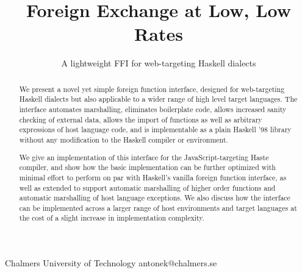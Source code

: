 \documentclass[preprint]{sigplanconf}
\begin{document}
\setlength{\pdfpageheight}{\paperheight}
\setlength{\pdfpagewidth}{\paperwidth}

\exclusivelicense
{} 





\title{Foreign Exchange at Low, Low Rates}
\subtitle{A lightweight FFI for web-targeting Haskell dialects}

           {Chalmers University of Technology}
           {antonek@chalmers.se}

\maketitle

\begin{abstract}
  We present a novel yet simple foreign function interface, designed for
  web-targeting Haskell dialects but also applicable to a wider range of
  high level target languages.
  The interface automates marshalling, eliminates boilerplate
  code, allows increased sanity checking of external data,
  allows the import of functions as well as arbitrary expressions of host
  language code, and is implementable as a plain Haskell '98 library
  without any modification to the Haskell compiler or environment.
  
  We give an implementation of this interface for the JavaScript-targeting
  Haste compiler, and show how the basic implementation can be
  further optimized with minimal effort to perform on par with Haskell's
  vanilla foreign function interface, as well as extended to support automatic
  marshalling of higher order functions and automatic marshalling of host
  language exceptions.
  We also discuss how the interface can be implemented across a larger range
  of host environments and target languages at the cost of a slight increase in
  implementation complexity.
\end{abstract}
\end{document}
